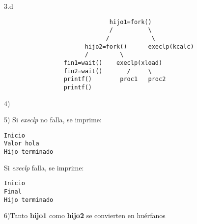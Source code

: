 \documentclass{article}
\begin{document}
3.d
\begin{verbatim}
                              hijo1=fork()
                              /          \
                             /            \
                       hijo2=fork()      execlp(kcalc)
                       /         \
                 fin1=wait()    execlp(xload)
                 fin2=wait()       /     \
                 printf()        proc1   proc2
                 printf()
\end{verbatim}

4)

5) Si \emph{execlp} no falla, se imprime:\\
\begin{verbatim}
Inicio
Valor hola
Hijo terminado
\end{verbatim}
 Si \emph{execlp} falla, se imprime:\\
\begin{verbatim}
Inicio
Final
Hijo terminado
\end{verbatim}
6)Tanto \textbf{hijo1} como \textbf{hijo2} se convierten en hu\'erfanos
\end{document}
